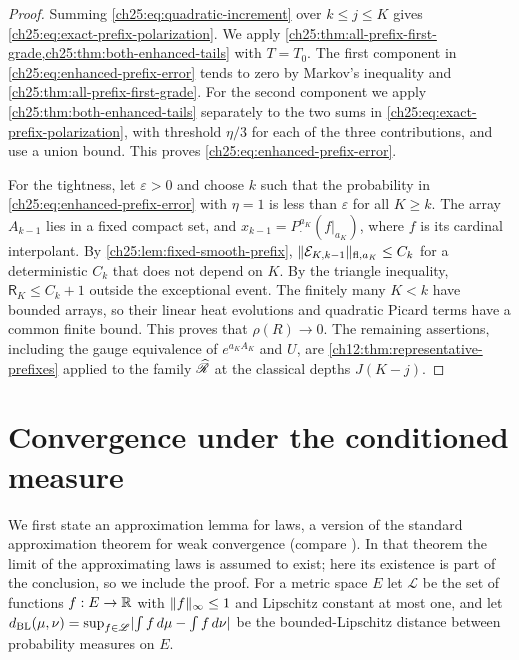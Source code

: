 \begin{proof}
Summing \eqref{ch25:eq:quadratic-increment} over $k\le j\le K$ gives \eqref{ch25:eq:exact-prefix-polarization}. We apply \cref{ch25:thm:all-prefix-first-grade,ch25:thm:both-enhanced-tails} with $T=T_0$. The first component in \eqref{ch25:eq:enhanced-prefix-error} tends to zero by Markov's inequality and \cref{ch25:thm:all-prefix-first-grade}. For the second component we apply \cref{ch25:thm:both-enhanced-tails} separately to the two sums in \eqref{ch25:eq:exact-prefix-polarization}, with threshold $\eta/3$ for each of the three contributions, and use a union bound. This proves \eqref{ch25:eq:enhanced-prefix-error}.

For the tightness, let $\varepsilon>0$ and choose $k$ such that the probability in \eqref{ch25:eq:enhanced-prefix-error} with $\eta=1$ is less than $\varepsilon$ for all $K\ge k$. The array $A_{k-1}$ lies in a fixed compact set, and $x_{k-1}=P_\cdot^{a_K}(f|_{a_K})$, where $f$ is its cardinal interpolant. By \cref{ch25:lem:fixed-smooth-prefix}, $\lVert \mathcal E_{K,k-1}\rVert_{\mathrm{fl},a_K}\le C_k$ for a deterministic $C_k$ that does not depend on $K$. By the triangle inequality, $\mathsf R_K\le C_k+1$ outside the exceptional event. The finitely many $K<k$ have bounded arrays, so their linear heat evolutions and quadratic Picard terms have a common finite bound. This proves that $\rho(R)\to0$. The remaining assertions, including the gauge equivalence of $e^{a_KA_K}$ and $U$, are \cref{ch12:thm:representative-prefixes} applied to the family $\widehat{\mathscr R}$ at the classical depths $J(K-j)$.
\end{proof}

\section{Convergence under the conditioned measure}\label{ch25:sec:conditioned}

We first state an approximation lemma for laws, a version of the standard approximation theorem for weak convergence (compare \cite[Theorem~3.2]{Billingsley1999}). In that theorem the limit of the approximating laws is assumed to exist; here its existence is part of the conclusion, so we include the proof. For a metric space $E$ let $\mathscr L$ be the set of functions $f:E\to\mathbb R$ with $\lVert f\rVert_\infty\le1$ and Lipschitz constant at most one, and let $d_{\mathrm{BL}}(\mu,\nu)=\sup_{f\in\mathscr L}\lvert \int f\,d\mu-\int f\,d\nu\rvert$ be the bounded-Lipschitz distance between probability measures on $E$.

